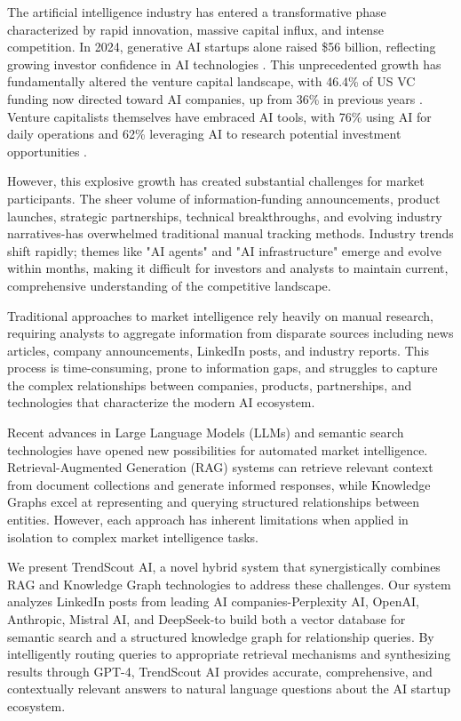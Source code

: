 \documentclass[11pt,twocolumn]{article}
\begin{document}
The artificial intelligence industry has entered a transformative phase characterized by rapid innovation, massive capital influx, and intense competition. In 2024, generative AI startups alone raised \$56 billion, reflecting growing investor confidence in AI technologies \cite{pitchbook2024}. This unprecedented growth has fundamentally altered the venture capital landscape, with 46.4\% of US VC funding now directed toward AI companies, up from 36\% in previous years \cite{cbinsights2024}. Venture capitalists themselves have embraced AI tools, with 76\% using AI for daily operations and 62\% leveraging AI to research potential investment opportunities \cite{vcsurvey2024}.

However, this explosive growth has created substantial challenges for market participants. The sheer volume of information-funding announcements, product launches, strategic partnerships, technical breakthroughs, and evolving industry narratives-has overwhelmed traditional manual tracking methods. Industry trends shift rapidly; themes like "AI agents" and "AI infrastructure" emerge and evolve within months, making it difficult for investors and analysts to maintain current, comprehensive understanding of the competitive landscape.

Traditional approaches to market intelligence rely heavily on manual research, requiring analysts to aggregate information from disparate sources including news articles, company announcements, LinkedIn posts, and industry reports. This process is time-consuming, prone to information gaps, and struggles to capture the complex relationships between companies, products, partnerships, and technologies that characterize the modern AI ecosystem.

Recent advances in Large Language Models (LLMs) and semantic search technologies have opened new possibilities for automated market intelligence. Retrieval-Augmented Generation (RAG) systems can retrieve relevant context from document collections and generate informed responses, while Knowledge Graphs excel at representing and querying structured relationships between entities. However, each approach has inherent limitations when applied in isolation to complex market intelligence tasks.

We present TrendScout AI, a novel hybrid system that synergistically combines RAG and Knowledge Graph technologies to address these challenges. Our system analyzes LinkedIn posts from leading AI companies-Perplexity AI, OpenAI, Anthropic, Mistral AI, and DeepSeek-to build both a vector database for semantic search and a structured knowledge graph for relationship queries. By intelligently routing queries to appropriate retrieval mechanisms and synthesizing results through GPT-4, TrendScout AI provides accurate, comprehensive, and contextually relevant answers to natural language questions about the AI startup ecosystem.
\end{document}
